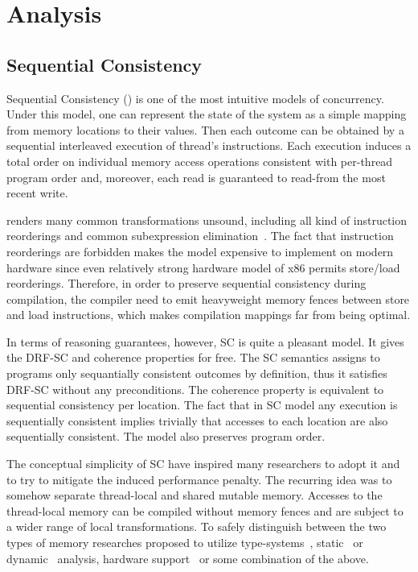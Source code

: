 \section{Analysis}
\label{sec:analysis}

\subsection{Sequential Consistency}

Sequential Consistency (\SC) is one of the most intuitive models of concurrency.
Under this model, one can represent the state of the system as 
a simple mapping from memory locations to their values. 
Then each outcome can be obtained by a sequential interleaved execution 
of thread's instructions. Each execution induces a total order 
on individual memory access operations consistent with per-thread program order
and, moreover, each read is guaranteed to read-from the most recent write. 

\SC renders many common transformations unsound, 
including all kind of instruction reorderings and 
common subexpression elimination~\cite{Marino-al:PLDI11, Sevcik-Aspinall:ECOOP08}.
The fact that instruction reorderings are forbidden 
makes the model expensive to implement on modern hardware
since even relatively strong hardware model of x86
permits store/load reorderings.
Therefore, in order to preserve sequential consistency during compilation,
the compiler need to emit heavyweight memory fences between store and load instructions,
which makes compilation mappings far from being optimal.  

In terms of reasoning guarantees, however, SC is quite a pleasant model. 
It gives the DRF-SC and coherence properties for free.
The SC semantics assigns to programs only sequantially consistent
outcomes by definition, thus it satisfies DRF-SC without any preconditions.
The coherence property is equivalent to sequential consistency per location.
The fact that in SC model any execution is sequentially consistent implies trivially
that accesses to each location are also sequentially consistent.
The model also preserves program order.

The conceptual simplicity of SC have inspired many researchers 
to adopt it and to try to mitigate the induced performance penalty.
The recurring idea was to somehow separate thread-local and shared mutable memory.
Accesses to the thread-local memory can be compiled 
without memory fences and are subject to a wider range 
of local transformations.
To safely distinguish between the two types of memory
researches proposed to utilize type-systems~\cite{Vollmer-al:PPoPP17},
static~\cite{Singh-al:ISCA12} or dynamic~\cite{Liu-al:PLDI19} analysis,
hardware support~\cite{Singh-al:ISCA12, Marino-al:PLDI10}
or some combination of the above. 

